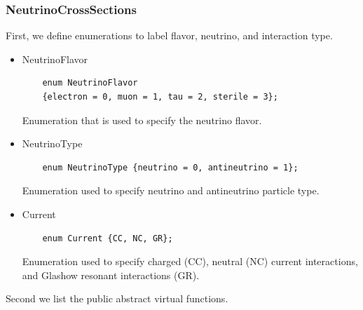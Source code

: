 \documentclass[3p,12pt]{elsarticle}
\newcommand{\ttf}{\ttfamily}
\begin{document}
\subsubsection{NeutrinoCrossSections\label{sec:neutrino_cross_section_class}}

First, we define enumerations to label flavor, neutrino, and interaction type.
\begin{itemize}
  \item {\ttf NeutrinoFlavor}
  \begin{lstlisting}
    enum NeutrinoFlavor
    {electron = 0, muon = 1, tau = 2, sterile = 3};
 \end{lstlisting}
  Enumeration that is used to specify the neutrino flavor.
  \item {\ttf NeutrinoType}
  \begin{lstlisting}
    enum NeutrinoType {neutrino = 0, antineutrino = 1};
  \end{lstlisting}
  Enumeration used to specify {\ttf neutrino} and {\ttf antineutrino} particle type.
  \item {\ttf Current}
  \begin{lstlisting}
    enum Current {CC, NC, GR};
  \end{lstlisting}
  Enumeration used to specify charged ({\ttf CC}), neutral ({\ttf NC}) current interactions, 
  and Glashow resonant interactions ({\ttf GR}).
\end{itemize}

Second we list the public abstract virtual functions.
\end{document}
